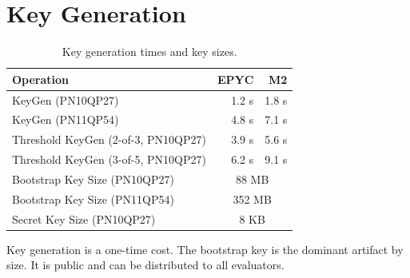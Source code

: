 \section{Key Generation}


\begin{table}[h]
\centering
\begin{tabular}{@{}lrr@{}}
\toprule
\textbf{Operation} & \textbf{EPYC} & \textbf{M2} \\
\midrule
KeyGen (PN10QP27) & 1.2 s & 1.8 s \\
KeyGen (PN11QP54) & 4.8 s & 7.1 s \\
Threshold KeyGen (2-of-3, PN10QP27) & 3.9 s & 5.6 s \\
Threshold KeyGen (3-of-5, PN10QP27) & 6.2 s & 9.1 s \\
\midrule
Bootstrap Key Size (PN10QP27) & \multicolumn{2}{c}{88 MB} \\
Bootstrap Key Size (PN11QP54) & \multicolumn{2}{c}{352 MB} \\
Secret Key Size (PN10QP27) & \multicolumn{2}{c}{8 KB} \\
\bottomrule
\end{tabular}
\caption{Key generation times and key sizes.}
\label{tab:keygen}
\end{table}

Key generation is a one-time cost. The bootstrap key is the dominant artifact by size. It is public and can be distributed to all evaluators.

